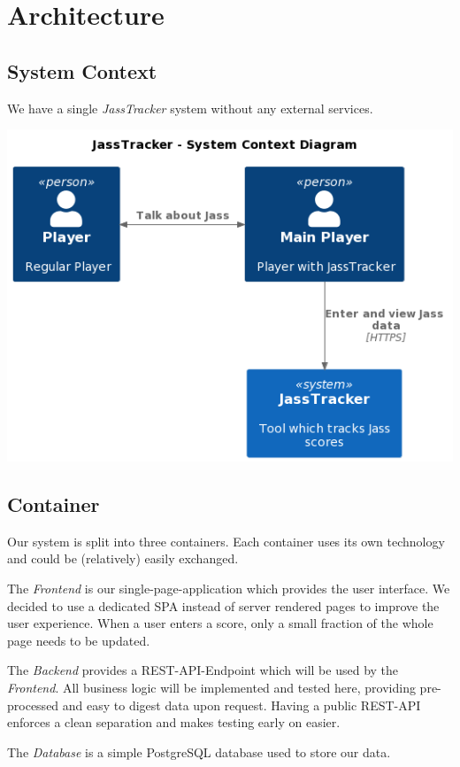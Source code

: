 \chapter{Architecture}

\section{System Context}
We have a single \emph{JassTracker} system without any external services.

\includegraphics[width=\textwidth]{resources/diagrams/c4-1-system-context}

\section{Container}
Our system is split into three containers.
Each container uses its own technology and could be (relatively) easily exchanged.

The \emph{Frontend} is our single-page-application which provides the user interface.
We decided to use a dedicated SPA instead of server rendered pages to improve the user experience.
When a user enters a score, only a small fraction of the whole page needs to be updated.

The \emph{Backend} provides a REST-API-Endpoint which will be used by the \emph{Frontend}.
All business logic will be implemented and tested here, providing pre-processed and easy to digest data upon request.
Having a public REST-API enforces a clean separation and makes testing early on easier.

The \emph{Database} is a simple PostgreSQL database used to store our data.


